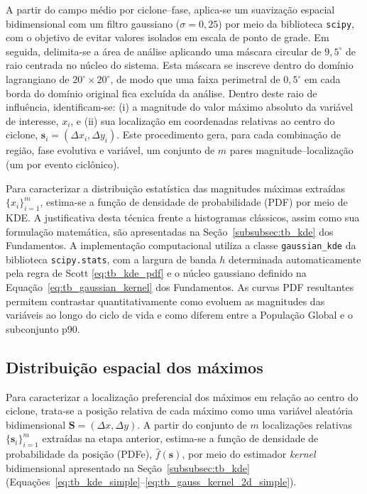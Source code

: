 A partir do campo médio por ciclone--fase, aplica-se um suavização espacial bidimensional com um filtro gaussiano ($\sigma = 0{,}25$) por meio da biblioteca \texttt{scipy}, com o objetivo de evitar valores isolados em escala de ponto de grade. Em seguida, delimita-se a área de análise aplicando uma máscara circular de $9{,}5^{\circ}$ de raio centrada no núcleo do sistema. Esta máscara se inscreve dentro do domínio lagrangiano de $20^{\circ} \times 20^{\circ}$, de modo que uma faixa perimetral de $0{,}5^{\circ}$ em cada borda do domínio original fica excluída da análise. Dentro deste raio de influência, identificam-se: (i) a magnitude do valor máximo absoluto da variável de interesse, $x_i$, e (ii) sua localização em coordenadas relativas ao centro do ciclone, $\mathbf{s}_i = (\Delta x_i, \Delta y_i)$. Este procedimento gera, para cada combinação de região, fase evolutiva e variável, um conjunto de $m$ pares magnitude--localização (um por evento ciclônico).

Para caracterizar a distribuição estatística das magnitudes máximas extraídas $\{x_i\}_{i=1}^{m}$, estima-se a função de densidade de probabilidade (PDF) por meio de KDE. A justificativa desta técnica frente a histogramas clássicos, assim como sua formulação matemática, são apresentadas na Seção~\ref{subsubsec:tb_kde} dos Fundamentos. A implementação computacional utiliza a classe \texttt{gaussian\_kde} da biblioteca \texttt{scipy.stats}, com a largura de banda $h$ determinada automaticamente pela regra de Scott \ref{eq:tb_kde_pdf} e o núcleo gaussiano definido na Equação~\ref{eq:tb_gaussian_kernel} dos Fundamentos. As curvas PDF resultantes permitem contrastar quantitativamente como evoluem as magnitudes das variáveis ao longo do ciclo de vida e como diferem entre a População Global e o subconjunto p90.

\subsection{Distribuição espacial dos máximos}\label{subsec:kde_localizacion}

Para caracterizar a localização preferencial dos máximos em relação ao centro do ciclone, trata-se a posição relativa de cada máximo como uma variável aleatória bidimensional $\mathbf{S} = (\Delta x, \Delta y)$. A partir do conjunto de $m$ localizações relativas $\{\mathbf{s}_i\}_{i=1}^{m}$ extraídas na etapa anterior, estima-se a função de densidade de probabilidade da posição (PDFe), $\hat{f}(\mathbf{s})$, por meio do estimador \textit{kernel} bidimensional apresentado na Seção~\ref{subsubsec:tb_kde} (Equações~\ref{eq:tb_kde_simple}--\ref{eq:tb_gauss_kernel_2d_simple}).

